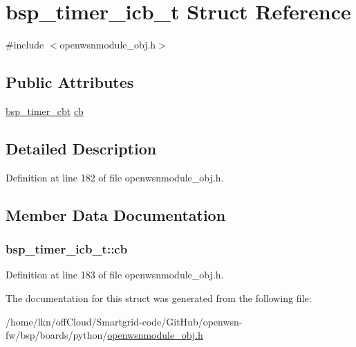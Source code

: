 \hypertarget{structbsp__timer__icb__t}{}\section{bsp\+\_\+timer\+\_\+icb\+\_\+t Struct Reference}
\label{structbsp__timer__icb__t}


{\ttfamily \#include $<$openwsnmodule\+\_\+obj.\+h$>$}

\subsection*{Public Attributes}
\begin{DoxyCompactItemize}
\item 
\hyperlink{openwsnmodule__obj_8h_a217f88f41d2d57897598ce4147c80419}{bsp\+\_\+timer\+\_\+cbt} \hyperlink{structbsp__timer__icb__t_a41fdc2ff16dd4356ec61ca6999935a9f}{cb}
\end{DoxyCompactItemize}


\subsection{Detailed Description}


Definition at line 182 of file openwsnmodule\+\_\+obj.\+h.



\subsection{Member Data Documentation}
\subsubsection[{\texorpdfstring{cb}{cb}}]{ bsp\+\_\+timer\+\_\+icb\+\_\+t\+::cb}\hypertarget{structbsp__timer__icb__t_a41fdc2ff16dd4356ec61ca6999935a9f}{}\label{structbsp__timer__icb__t_a41fdc2ff16dd4356ec61ca6999935a9f}


Definition at line 183 of file openwsnmodule\+\_\+obj.\+h.



The documentation for this struct was generated from the following file\+:\begin{DoxyCompactItemize}
\item 
/home/lkn/off\+Cloud/\+Smartgrid-\/code/\+Git\+Hub/openwsn-\/fw/bsp/boards/python/\hyperlink{openwsnmodule__obj_8h}{openwsnmodule\+\_\+obj.\+h}\end{DoxyCompactItemize}
